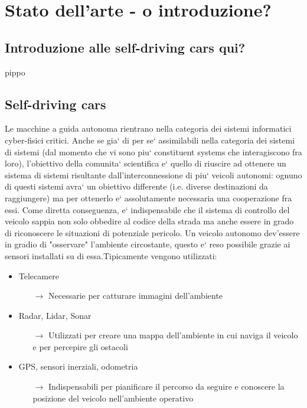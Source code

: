 \chapter{Stato dell'arte - o introduzione?}

\section{Introduzione alle self-driving cars qui?}

pippo

\section{Self-driving cars}

Le macchine a guida autonoma rientrano nella categoria dei sistemi informatici cyber-fisici critici. Anche se gia` di per se` assimilabili nella categoria dei sistemi di sistemi (dal momento che vi sono piu` constituent systems che interagiscono fra loro), l'obiettivo della comunita` scientifica e` quello di riuscire ad ottenere un sistema di sistemi risultante dall'interconnessione di piu` veicoli autonomi: ognuno di questi sistemi avra` un obiettivo differente (i.e. diverse destinazioni da raggiungere) ma per ottenerlo e` assolutamente necessaria una cooperazione fra essi. Come diretta conseguenza, e` indispensabile che il sistema di controllo del veicolo sappia non solo obbedire al codice della strada ma anche essere in grado di riconoscere le situazioni di potenziale pericolo.\newline
Un veicolo autonomo dev'essere in gradio di "osservare" l'ambiente circostante, questo e` reso possibile grazie ai sensori installati su di essa.\newline\newline Tipicamente vengono utilizzati:
\begin{itemize}
	\item Telecamere
		\begin{itemize}
			\item[$\rightarrow$] Necessarie per catturare immagini dell'ambiente
		\end{itemize}
	\item Radar, Lidar, Sonar
		\begin{itemize}
			\item[$\rightarrow$] Utilizzati per creare una mappa dell'ambiente in cui naviga il veicolo e per percepire gli ostacoli
		\end{itemize}
	\item GPS, sensori inerziali, odometria
		\begin{itemize}
			\item[$\rightarrow$] Indispensabili per pianificare il percorso da seguire e conoscere la posizione del veicolo nell'ambiente operativo
		\end{itemize}
\end{itemize}

